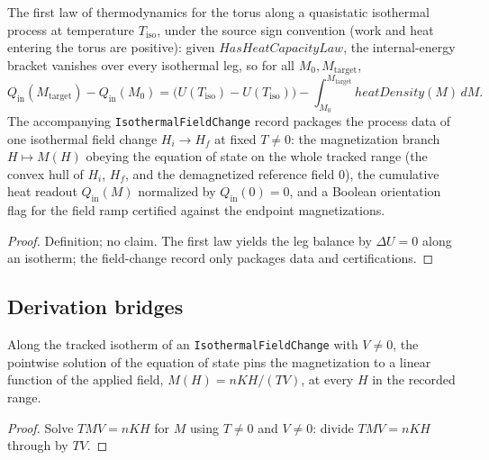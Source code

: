 \begin{definition}
\label{def:IPhO2026Problems_problem_IPhO_2026_3_B_1:ObeysFirstLawMagnetic}
The first law of thermodynamics for the torus along a quasistatic
isothermal process at temperature $T_{\mathrm{iso}}$, under the source sign
convention (work and heat entering the torus are positive): given
$\mathit{HasHeatCapacityLaw}$, the internal-energy bracket vanishes over
every isothermal leg, so for all $M_0, M_{\mathrm{target}}$,
\[
Q_{\mathrm{in}}(M_{\mathrm{target}}) - Q_{\mathrm{in}}(M_0)
= \bigl(U(T_{\mathrm{iso}}) - U(T_{\mathrm{iso}})\bigr)
- \int_{M_0}^{M_{\mathrm{target}}} \mathit{heatDensity}(M)\,dM .
\]
The accompanying \texttt{IsothermalFieldChange} record packages the process
data of one isothermal field change $H_i \to H_f$ at fixed $T \neq 0$: the
magnetization branch $H \mapsto M(H)$ obeying the equation of state on the
whole tracked range (the convex hull of $H_i$, $H_f$, and the demagnetized
reference field $0$), the cumulative heat readout $Q_{\mathrm{in}}(M)$
normalized by $Q_{\mathrm{in}}(0) = 0$, and a Boolean orientation flag for
the field ramp certified against the endpoint magnetizations.
\end{definition}
\begin{proof}
Definition; no claim.  The first law yields the leg balance by
$\Delta U = 0$ along an isotherm; the field-change record only packages
data and certifications.
\end{proof}

\subsection*{Derivation bridges}

\begin{lemma}
\label{lem:IPhO2026Problems_problem_IPhO_2026_3_B_1:MagnetizationEqEosSolution}
Along the tracked isotherm of an \texttt{IsothermalFieldChange} with
$V \neq 0$, the pointwise solution of the equation of state pins the
magnetization to a linear function of the applied field,
$M(H) = n K H / (T V)$, at every $H$ in the recorded range.
\end{lemma}
\begin{proof}
Solve $T M V = n K H$ for $M$ using $T \neq 0$ and $V \neq 0$: divide
$T M V = n K H$ through by $T V$.
\end{proof}

